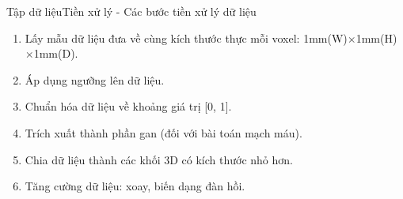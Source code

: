 \documentclass[
	10pt,                %
	aspectratio=169,     %
]{beamer}
\begin{document}
	\begin{frame}{Tập dữ liệu}{Tiền xử lý - Các bước tiền xử lý dữ liệu}
	    \vspace{-1.5cm}
		\begin{enumerate}
			\item Lấy mẫu dữ liệu đưa về cùng kích thước thực mỗi voxel: 1mm(W)$\times$1mm(H)$\times$1mm(D).
			\item Áp dụng ngưỡng lên dữ liệu.				
			\item Chuẩn hóa dữ liệu về khoảng giá trị [0, 1].
			\item Trích xuất thành phần gan (đối với bài toán mạch máu).
			\item Chia dữ liệu thành các khối 3D có kích thước nhỏ hơn.
			\item Tăng cường dữ liệu: xoay, biến dạng đàn hồi.
		\end{enumerate}
		
        \vspace{-0.5cm}
	\end{frame}
	
\end{document}
